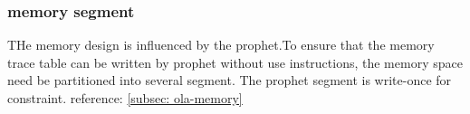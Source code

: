 \subsubsection{memory segment}
THe memory design is influenced by the prophet.To ensure that the memory trace table can be written by prophet without use instructions, the memory space need be partitioned into several segment.
The prophet segment is write-once for constraint. reference: \ref{subsec: ola-memory}